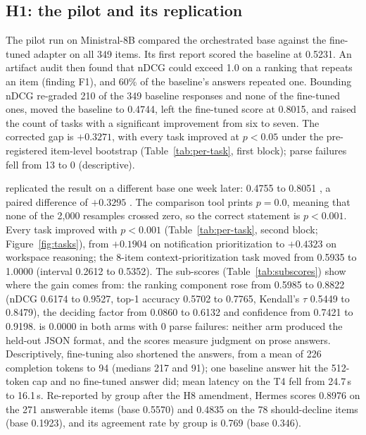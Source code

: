 \subsection{H1: the pilot and its replication}
The pilot run on Ministral-8B compared the orchestrated base against the fine-tuned adapter on all 349 items. Its first report scored the baseline at 0.5231. An artifact audit then found that nDCG could exceed 1.0 on a ranking that repeats an item (finding F1), and 60\% of the baseline's answers repeated one. Bounding nDCG re-graded 210 of the 349 baseline responses and none of the fine-tuned ones, moved the baseline to 0.4744, left the fine-tuned score at 0.8015, and raised the count of tasks with a significant improvement from six to seven. The corrected gap is $+0.3271$, with every task improved at $p<0.05$ under the pre-registered item-level bootstrap (Table~\ref{tab:per-task}, first block); parse failures fell from 13 to 0 (descriptive).

\hermes{} replicated the result on a different base one week later: 0.4755  to 0.8051 , a paired difference of $+0.3295$ . The comparison tool prints $p = 0.0$, meaning that none of the 2,000 resamples crossed zero, so the correct statement is $p<0.001$. Every task improved with $p<0.001$ (Table~\ref{tab:per-task}, second block; Figure~\ref{fig:tasks}), from $+0.1904$ on notification prioritization to $+0.4323$ on workspace reasoning; the 8-item context-prioritization task moved from 0.5935 to 1.0000 (interval 0.2612 to 0.5352). The sub-scores (Table~\ref{tab:subscores}) show where the gain comes from: the ranking component rose from 0.5985 to 0.8822 (nDCG 0.6174 to 0.9527, top-1 accuracy 0.5702 to 0.7765, Kendall's $\tau$ 0.5449 to 0.8479), the deciding factor from 0.0860 to 0.6132 and confidence from 0.7421 to 0.9198.  is 0.0000 in both arms with 0 parse failures: neither arm produced the held-out JSON format, and the scores measure judgment on prose answers. Descriptively, fine-tuning also shortened the answers, from a mean of 226 completion tokens to 94 (medians 217 and 91); one baseline answer hit the 512-token cap and no fine-tuned answer did; mean latency on the T4 fell from 24.7\,s to 16.1\,s. Re-reported by group after the H8 amendment, Hermes scores 0.8976  on the 271 answerable items (base 0.5570) and 0.4835 on the 78 should-decline items (base 0.1923), and its agreement rate by group is 0.769 (base 0.346).

